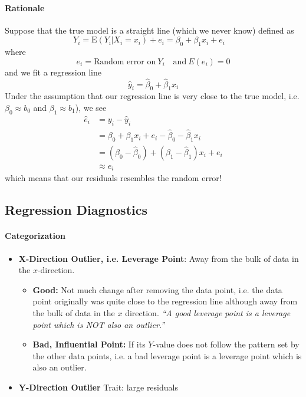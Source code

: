 \documentclass[11pt]{article}
\begin{document}
\paragraph{Rationale} Suppose that the true model is a straight line (which we never know) defined as
\begin{equation}
    Y_{i}=\mathrm{E}\left(Y_{\mathrm{i}} | X_{i}=x_{i}\right)+e_{i}=\beta_{0}+\beta_{1} x_{i}+e_{i} \quad 
\end{equation}
where
\begin{equation*}
    e_i = \text{Random error on}~Y_i\quad \text{and} ~E(e_i) = 0
\end{equation*}
and we fit a regression line
\begin{equation*}
    \hat{y}_{i}=\hat{\beta}_{0}+\hat{\beta}_{1} x_{i}
\end{equation*}
Under the assumption that our regression line is very close to the true model, i.e. $\beta_0 \approx b_0$ and $\beta_1 \approx b_1$), we see
\begin{align*}
    \hat{e}_{i} 
    &= y_{i}-\hat{y}_{i} \\
    &= \beta_{0}+\beta_{1} x_{i} + e_i - \hat{\beta}_{0} - \hat{\beta}_{1} x_{i} \\
    &= \left(\beta_{0}-\hat{\beta}_{0}\right)+\left(\beta_{1}-\hat{\beta}_{1}\right) x_{i}+e_{i} \\
    &\approx e_i
\end{align*}
which means that our residuals resembles the random error! 

\subsection{Regression Diagnostics}
\paragraph{Categorization}
\begin{itemize}
    \item \textbf{X-Direction Outlier, i.e. Leverage Point}: Away from the bulk of data in the $x$-direction. 
    \begin{itemize}
        \item \textbf{Good:} Not much change after removing the data point, i.e. the data point originally was quite close to the regression line although away from the bulk of data in the $x$ direction. \textit{``A good leverage point is a leverage point which is NOT also an outlier.''}
        \item \textbf{Bad, Influential Point:} If its $Y$-value does not follow the pattern set by the other data points, i.e. a bad leverage point is a leverage point which is also an outlier. 
    \end{itemize}
    \item \textbf{Y-Direction Outlier} Trait: large residuals
\end{itemize}
\end{document}

